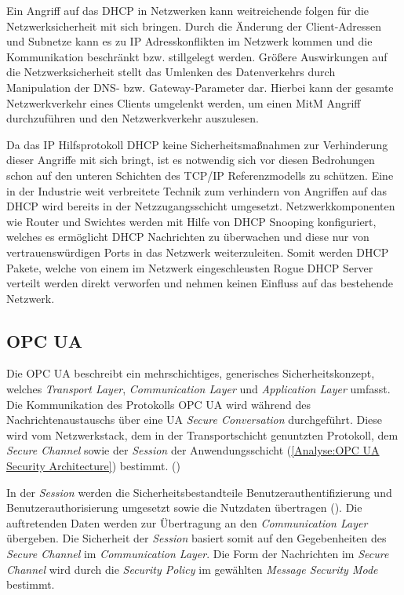 Ein Angriff auf das \ac{DHCP} in Netzwerken kann weitreichende folgen für die Netzwerksicherheit mit sich bringen. Durch die Änderung der Client-Adressen und Subnetze kann es zu \ac{IP} Adresskonflikten im Netzwerk kommen und die Kommunikation beschränkt bzw. stillgelegt werden. Größere Auswirkungen auf die Netzwerksicherheit stellt das Umlenken des Datenverkehrs durch Manipulation der \ac{DNS}- bzw. Gateway-Parameter dar. Hierbei kann der gesamte Netzwerkverkehr eines Clients umgelenkt werden, um einen \ac{MitM} Angriff durchzuführen und den Netzwerkverkehr auszulesen.

Da das \ac{IP} Hilfsprotokoll \ac{DHCP} keine Sicherheitsmaßnahmen zur Verhinderung dieser Angriffe mit sich bringt, ist es notwendig sich vor diesen Bedrohungen schon auf den unteren Schichten des \ac{TCP}/\ac{IP} Referenzmodells zu schützen. Eine in der Industrie weit verbreitete Technik zum verhindern von Angriffen auf das \ac{DHCP} wird bereits in der Netzzugangsschicht umgesetzt. Netzwerkkomponenten wie Router und Swichtes werden mit Hilfe von \ac{DHCP} Snooping konfiguriert, welches es ermöglicht \ac{DHCP} Nachrichten zu überwachen und diese nur von vertrauenswürdigen Ports in das Netzwerk weiterzuleiten. Somit werden \ac{DHCP} Pakete, welche von einem im Netzwerk eingeschleusten Rogue \ac{DHCP} Server verteilt werden direkt verworfen und nehmen keinen Einfluss auf das bestehende Netzwerk.

\subsection{\ac{OPC UA}}
\label{Analyse:OPC UA}
Die \ac{OPC UA} beschreibt ein mehrschichtiges, generisches Sicherheitskonzept, welches \textit{Transport Layer}, \textit{Communication Layer} und \textit{Application Layer} umfasst. Die Kommunikation des Protokolls \ac{OPC UA} wird während des Nachrichtenaustauschs über eine \ac{UA} \textit{Secure Conversation} durchgeführt. Diese wird vom Netzwerkstack, dem in der Transportschicht genuntzten Protokoll, dem \textit{Secure Channel} sowie der \textit{Session} der Anwendungsschicht (\autoref{Analyse:OPC UA Security Architecture}) bestimmt. (\cite{opcpt2})

In der \textit{Session} werden die Sicherheitsbestandteile Benutzerauthentifizierung und Benutzerauthorisierung umgesetzt sowie die Nutzdaten übertragen (\cite{opcpt2}). Die auftretenden Daten werden zur Übertragung an den \textit{Communication Layer} übergeben. Die Sicherheit der \textit{Session} basiert somit auf den Gegebenheiten des \textit{Secure Channel} im \textit{Communication Layer}. Die Form der Nachrichten im \textit{Secure Channel} wird durch die \textit{Security Policy} im gewählten \textit{Message Security Mode} bestimmt. 

